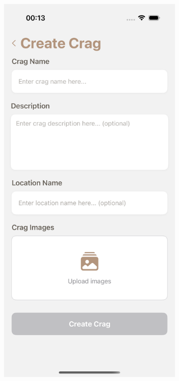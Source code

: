 \begin{figure}[H]
    \centering
    \begin{subfigure}[b]{0.31\textwidth}
        \centering
        \includegraphics[width=\textwidth]{images/implementacija/editing-options/create_crag.png}

\end{subfigure}
\end{figure}
